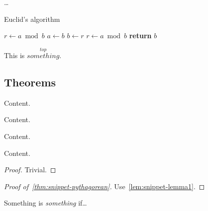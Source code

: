 {    %
    \ldots
    
    \begin{algorithm}
        \caption{Euclid's algorithm}
        \label{alg:snippet-euclid}
        \begin{algorithmic}
            \State $r\gets a\bmod b$
            \State $a\gets b$
            \State $b\gets r$
            \State $r\gets a\bmod b$
            \EndWhile\label{alg:snippet-euclidendwhile}
            \State \textbf{return} $b$
            \EndProcedure
        \end{algorithmic}
    \end{algorithm}

    This is $\overset{top}{something}$.
    
    \subsection*{Theorems}
    
    \begin{theorem}
        \label{thm:snippet-pythagorean}
        Content.
    \end{theorem}
    
    \begin{corollary}
        Content.
    \end{corollary}
    
    \begin{corollary}
        Content.
    \end{corollary}
    
    \begin{lemma}
        \label{lem:snippet-lemma1}
        Content.
    \end{lemma}
    
    \begin{proof}
        Trivial.
    \end{proof}
    
    \begin{proof}[Proof of~\autoref{thm:snippet-pythagorean}]
        Use~\autoref{lem:snippet-lemma1}.
    \end{proof}

    \begin{definition}
        Something is \textit{something} if\ldots
    \end{definition}
}
